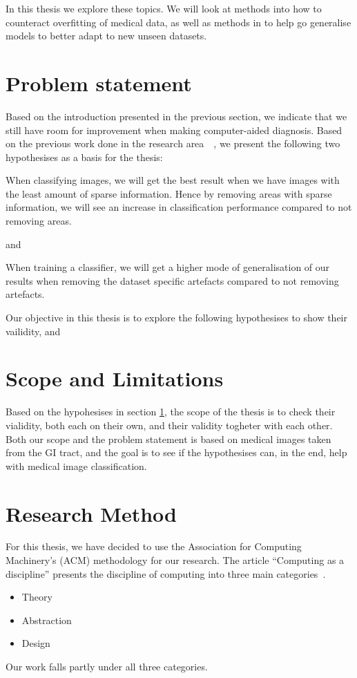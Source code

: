 In this thesis we explore these topics. We will look at methods into how to counteract overfitting of medical data, as well as methods in to help go generalise models to better adapt to new unseen datasets.


\section{Problem statement}
\label{cha:problemstatement}
Based on the introduction presented in the previous section, we indicate that we still have room for improvement when making computer-aided diagnosis. Based on the previous work done in the research area~\cite{25956}~\cite{25953}, we present the following two hypothesises as a basis for the thesis:


\noindent
\begin{hyp} \label{hyp:a}
When classifying images, we will get the best result when we have images with the least amount of sparse information. 
Hence by removing areas with sparse information,
we will see an increase in classification performance compared to not removing areas.
\end{hyp}

\noindent
and

\noindent 
\begin{hyp} \label{hyp:b}
When training a classifier, we will get a higher
mode of generalisation of our results when removing the dataset
specific artefacts compared to not removing artefacts.
\end{hyp}
\vspace{5px}


Our objective in this thesis is to explore the following hypothesises to show their vailidity, and 


\section{Scope and Limitations}
Based on the hypohesises in section \ref{cha:problemstatement}, the scope of the thesis is to check their vialidity, both each on their own, and their validity togheter with each other. 
Both our scope and the problem statement is based on medical images taken from the GI tract, and the goal is to see if the hypothesises can, in the end, help with medical image classification.


\section{Research Method}
For this thesis, we have decided to use the Association for Computing Machinery's (ACM) methodology for our research. The article ``Computing as a discipline'' presents the discipline of computing into three main categories~\cite{Denning:1989:CD:63238.63239}. 
\begin{itemize}
\item Theory
\item Abstraction
\item Design
\end{itemize}
Our work falls partly under all three categories.

